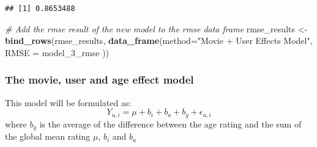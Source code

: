 \documentclass[]{article}
\newenvironment{Shaded}{\begin{snugshade}}{\end{snugshade}}
\newcommand{\KeywordTok}[1]{\textcolor[rgb]{0.13,0.29,0.53}{\textbf{#1}}}
\newcommand{\DataTypeTok}[1]{\textcolor[rgb]{0.13,0.29,0.53}{#1}}
\newcommand{\StringTok}[1]{\textcolor[rgb]{0.31,0.60,0.02}{#1}}
\newcommand{\CommentTok}[1]{\textcolor[rgb]{0.56,0.35,0.01}{\textit{#1}}}
\newcommand{\NormalTok}[1]{#1}
\begin{document}
\begin{verbatim}
## [1] 0.8653488
\end{verbatim}

\begin{Shaded}
\begin{Highlighting}[]
\CommentTok{# Add the rmse result of the new model to the rmse data frame}
\NormalTok{rmse_results <-}\StringTok{ }\KeywordTok{bind_rows}\NormalTok{(rmse_results,}
                          \KeywordTok{data_frame}\NormalTok{(}\DataTypeTok{method=}\StringTok{"Movie + User Effects Model"}\NormalTok{,  }
                                     \DataTypeTok{RMSE =}\NormalTok{ model_3_rmse ))}
\end{Highlighting}
\end{Shaded}

\subsubsection{The movie, user and age effect
model}\label{the-movie-user-and-age-effect-model}

This model will be formulated as:
\[ Y_{u,i} = \mu + b_i +b_a + b_g + \epsilon_{u,i} \] where \(b_g\) is
the average of the difference between the age rating and the sum of the
global mean rating \(\mu\), \(b_i\) and \(b_a\)
\end{document}
